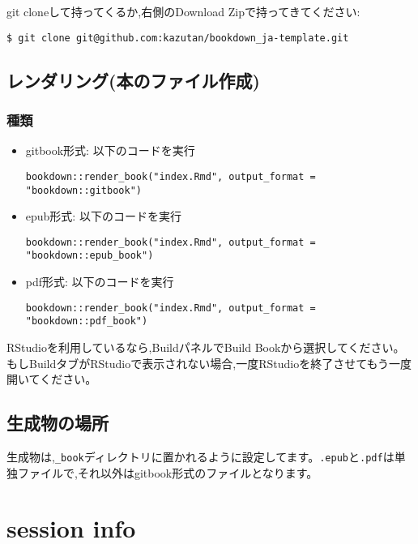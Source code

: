 \documentclass[]{book}
\begin{document}
git cloneして持ってくるか,右側のDownload Zipで持ってきてください:

\begin{verbatim}
$ git clone git@github.com:kazutan/bookdown_ja-template.git
\end{verbatim}

\subsection{レンダリング(本のファイル作成)}

\subsubsection{種類}

\begin{itemize}
\item
  gitbook形式: 以下のコードを実行

\begin{verbatim}
bookdown::render_book("index.Rmd", output_format = "bookdown::gitbook")
\end{verbatim}
\item
  epub形式: 以下のコードを実行

\begin{verbatim}
bookdown::render_book("index.Rmd", output_format = "bookdown::epub_book")
\end{verbatim}
\item
  pdf形式: 以下のコードを実行

\begin{verbatim}
bookdown::render_book("index.Rmd", output_format = "bookdown::pdf_book")
\end{verbatim}
\end{itemize}

RStudioを利用しているなら,BuildパネルでBuild
Bookから選択してください。もしBuildタブがRStudioで表示されない場合,一度RStudioを終了させてもう一度開いてください。

\subsection{生成物の場所}

生成物は,\texttt{\_book}ディレクトリに置かれるように設定してます。\texttt{.epub}と\texttt{.pdf}は単独ファイルで,それ以外はgitbook形式のファイルとなります。

\section{session info}\label{session-info}
\end{document}
